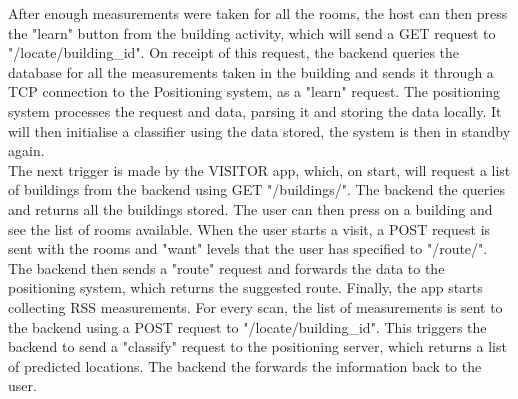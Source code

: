 After enough measurements were taken for all the rooms, the host can then press the "learn" button from the building activity, which will send a GET request to "/locate/building\_id". On receipt of this request, the backend queries the database for all the measurements taken in the building and sends it through a TCP connection to the Positioning system, as a "learn" request. The positioning system processes the request and data, parsing it and storing the data locally. It will then initialise a classifier using the data stored, the system is then in standby again. \\
The next trigger is made by the VISITOR app, which, on start, will request a list of buildings from the backend using GET "/buildings/". The backend the queries and returns all the buildings stored. The user can then press on a building and see the list of rooms available. When the user starts a visit, a POST request is sent with the rooms and "want" levels that the user has specified to "/route/". The backend then sends a "route" request and forwards the data to the positioning system, which returns the suggested route. Finally, the app starts collecting RSS measurements. For every scan, the list of measurements is sent to the backend using a POST request to "/locate/building\_id". This triggers the backend to send a "classify" request to the positioning server, which returns a list of predicted locations. The backend the forwards the information back to the user.


